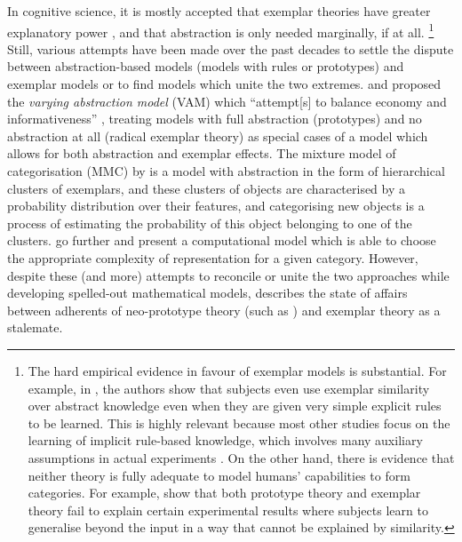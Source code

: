 In cognitive science, it is mostly accepted that exemplar theories have greater explanatory power \citep[184]{Vanpaemel2016}, and that abstraction is only needed marginally, if at all.%
\footnote{The hard empirical evidence in favour of exemplar models is substantial.
  For example, in \cite{HahnEa2010}, the authors show that subjects even use exemplar similarity over abstract knowledge even when they are given very simple explicit rules to be learned.
  This is highly relevant because most other studies focus on the learning of implicit rule-based knowledge, which involves many auxiliary assumptions in actual experiments \citep[2]{HahnEa2010}.
On the other hand, there is evidence that neither theory is fully adequate to model humans' capabilities to form categories.
For example, \cite{ConawayKurtz2016} show that both prototype theory and exemplar theory fail to explain certain experimental results where subjects learn to generalise beyond the input in a way that cannot be explained by similarity.
}
Still, various attempts have been made over the past decades to settle the dispute between abstraction-based models (models with rules or prototypes) and exemplar models or to find models which unite the two extremes.
\cite{VanpaemelStorms2008} and \citet{LeeVanpaemel2008} proposed the \textit{varying abstraction model} (VAM) which ``attempt[s] to balance economy and informativeness'' \citep[745]{LeeVanpaemel2008}, treating models with full abstraction (prototypes) and no abstraction at all (radical exemplar theory) as special cases of a model which allows for both abstraction and exemplar effects.
The mixture model of categorisation (MMC) by \cite{Rosseel2002} is a model with abstraction in the form of hierarchical clusters of exemplars, and these clusters of objects are characterised by a probability distribution over their features, and categorising new objects is a process of estimating the probability of this object belonging to one of the clusters.
\cite{GriffithsEa2009} go further and present a computational model which is able to choose the appropriate complexity of representation for a given category.
However, despite these (and more) attempts to reconcile or unite the two approaches while developing spelled-out mathematical models, \cite[183--184]{Vanpaemel2016} describes the state of affairs between adherents of neo-prototype theory (such as \citealp{MindaSmith2001,MindaSmith2002}) and exemplar theory as a stalemate.


